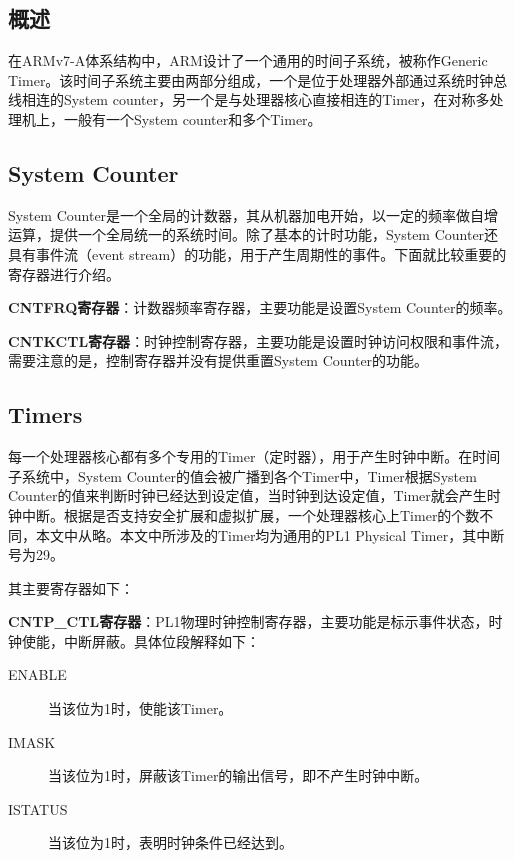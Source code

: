 \documentclass[a4paper, 12pt]{report}
\begin{document}
    \subsection{概述}
    
    在ARMv7-A体系结构中，ARM设计了一个通用的时间子系统，被称作Generic Timer。该时间子系统主要由两部分组成，一个是位于处理器外部通过系统时钟总线相连的System counter，另一个是与处理器核心直接相连的Timer，在对称多处理机上，一般有一个System counter和多个Timer。
    
    \subsection{System Counter}
    
    System Counter是一个全局的计数器，其从机器加电开始，以一定的频率做自增运算，提供一个全局统一的系统时间。除了基本的计时功能，System Counter还具有事件流（event stream）的功能，用于产生周期性的事件。下面就比较重要的寄存器进行介绍。

    \textbf{CNTFRQ寄存器}：计数器频率寄存器，主要功能是设置System Counter的频率。
    
    \textbf{CNTKCTL寄存器}：时钟控制寄存器，主要功能是设置时钟访问权限和事件流，需要注意的是，控制寄存器并没有提供重置System Counter的功能。
    
    \subsection{Timers}
    
    每一个处理器核心都有多个专用的Timer（定时器），用于产生时钟中断。在时间子系统中，System Counter的值会被广播到各个Timer中，Timer根据System Counter的值来判断时钟已经达到设定值，当时钟到达设定值，Timer就会产生时钟中断。根据是否支持安全扩展和虚拟扩展，一个处理器核心上Timer的个数不同，本文中从略。本文中所涉及的Timer均为通用的PL1 Physical Timer，其中断号为29。
    
    其主要寄存器如下：

    \textbf{CNTP\_CTL寄存器}：PL1物理时钟控制寄存器，主要功能是标示事件状态，时钟使能，中断屏蔽。具体位段解释如下：
    
    \begin{description}
        \item[ENABLE] 当该位为1时，使能该Timer。
        \item[IMASK] 当该位为1时，屏蔽该Timer的输出信号，即不产生时钟中断。
        \item[ISTATUS] 当该位为1时，表明时钟条件已经达到。
    \end{description}
    
\end{document}
